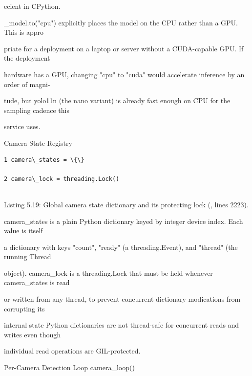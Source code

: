 ecient in CPython.

\_model.to("cpu") explicitly places the model on the CPU rather than a GPU. This is appro-

priate for a deployment on a laptop or server without a CUDA-capable GPU. If the deployment

hardware has a GPU, changing "cpu" to "cuda" would accelerate inference by an order of magni-

tude, but yolo11n (the nano variant) is already fast enough on CPU for the sampling cadence this

service uses.

Camera State Registry

\begin{listingbox}
	\begin{verbatim}
1 camera\_states = \{\}

2 camera\_lock = threading.Lock()


\end{verbatim}
\end{listingbox}
Listing 5.19: Global camera state dictionary and its protecting lock (, lines 2223).

camera\_states is a plain Python dictionary keyed by integer device index. Each value is itself

a dictionary with keys "count", "ready" (a threading.Event), and "thread" (the running Thread

object). camera\_lock is a threading.Lock that must be held whenever camera\_states is read

or written from any thread, to prevent concurrent dictionary modications from corrupting its

internal state  Python dictionaries are not thread-safe for concurrent reads and writes even though

individual read operations are GIL-protected.

Per-Camera Detection Loop  camera\_loop()

